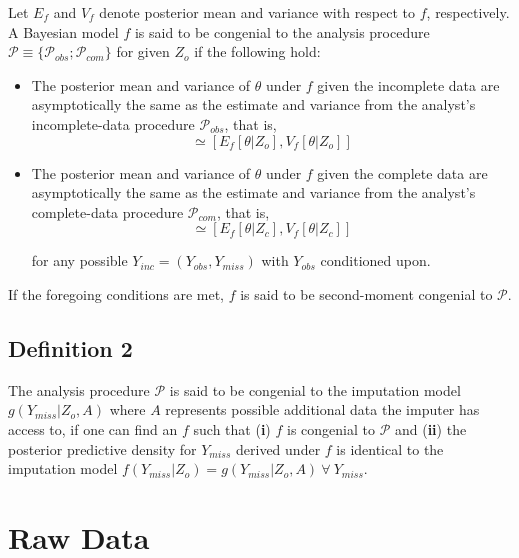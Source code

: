 \documentclass[
  letterpaper,
  DIV=11,
  numbers=noendperiod]{scrreprt}
\begin{document}
Let \(E_f\) and \(V_f\) denote posterior mean and variance with respect
to \(f\), respectively. A Bayesian model \(f\) is said to be congenial
to the analysis procedure
\(\mathscr{P} \equiv \{\mathscr{P}_{obs}; \mathscr{P}_{com}\}\) for
given \(Z_o\) if the following hold:

\begin{itemize}
\item
  The posterior mean and variance of \(\theta\) under \(f\) given the
  incomplete data are asymptotically the same as the estimate and
  variance from the analyst's incomplete-data procedure
  \(\mathscr{P}_{obs}\), that is, \begin{equation}
      [\hat{\theta}(Z_o), U(Z_o)] \simeq [E_f[\theta | Z_o], V_f[\theta | Z_o]]
  \end{equation}
\item
  The posterior mean and variance of \(\theta\) under \(f\) given the
  complete data are asymptotically the same as the estimate and variance
  from the analyst's complete-data procedure \(\mathscr{P}_{com}\), that
  is, \begin{equation}
       [\hat{\theta}(Z_c), U(Z_c)] \simeq [E_f[\theta | Z_c], V_f[\theta | Z_c]]
  \end{equation}

  for any possible \(Y_{inc} = (Y_{obs}, Y_{miss})\) with \(Y_{obs}\)
  conditioned upon.
\end{itemize}

If the foregoing conditions are met, \(f\) is said to be second-moment
congenial to \(\mathscr{P}\).

\hypertarget{definition-2}{%
\subsection*{Definition 2}\label{definition-2}}

The analysis procedure \(\mathscr{P}\) is said to be congenial to the
imputation model \(g(Y_{miss}|Z_o, A)\) where \(A\) represents possible
additional data the imputer has access to, if one can find an \(f\) such
that (\textbf{i}) \(f\) is congenial to \(\mathscr{P}\) and
(\textbf{ii}) the posterior predictive density for \(Y_{miss}\) derived
under \(f\) is identical to the imputation model
\(f(Y_{miss}|Z_o) = g(Y_{miss}|Z_o, A) \ \forall \ Y_{miss}\).

\hypertarget{raw-data}{%
\section*{Raw Data}\label{raw-data}}
\end{document}

